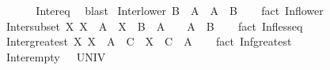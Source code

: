 \begin{isabellebody}
\ \ %
\isanewline
%
\isadelimproof
\ \ %
\endisadelimproof
%
\isatagproof
{}\isamarkupfalse%
\ Inter{\isacharunderscore}{\kern0pt}eq\ \isamarkupfalse%
\ blast%
\endisatagproof
{\isafoldproof}%
%
\isadelimproof
\isanewline
%
\endisadelimproof
\isanewline
{}\isamarkupfalse%
\ Inter{\isacharunderscore}{\kern0pt}lower{\isacharcolon}{\kern0pt}\ {\isachardoublequoteopen}B\ {\isasymin}\ A\ {\isasymLongrightarrow}\ {\isasymInter}A\ {\isasymsubseteq}\ B{\isachardoublequoteclose}\isanewline
%
\isadelimproof
\ \ %
\endisadelimproof
%
\isatagproof
{}\isamarkupfalse%
\ {\isacharparenleft}{\kern0pt}fact\ Inf{\isacharunderscore}{\kern0pt}lower{\isacharparenright}{\kern0pt}%
\endisatagproof
{\isafoldproof}%
%
\isadelimproof
\isanewline
%
\endisadelimproof
\isanewline
{}\isamarkupfalse%
\ Inter{\isacharunderscore}{\kern0pt}subset{\isacharcolon}{\kern0pt}\ {\isachardoublequoteopen}{\isacharparenleft}{\kern0pt}{\isasymAnd}X{\isachardot}{\kern0pt}\ X\ {\isasymin}\ A\ {\isasymLongrightarrow}\ X\ {\isasymsubseteq}\ B{\isacharparenright}{\kern0pt}\ {\isasymLongrightarrow}\ A\ {\isasymnoteq}\ {\isacharbraceleft}{\kern0pt}{\isacharbraceright}{\kern0pt}\ {\isasymLongrightarrow}\ {\isasymInter}A\ {\isasymsubseteq}\ B{\isachardoublequoteclose}\isanewline
%
\isadelimproof
\ \ %
\endisadelimproof
%
\isatagproof
{}\isamarkupfalse%
\ {\isacharparenleft}{\kern0pt}fact\ Inf{\isacharunderscore}{\kern0pt}less{\isacharunderscore}{\kern0pt}eq{\isacharparenright}{\kern0pt}%
\endisatagproof
{\isafoldproof}%
%
\isadelimproof
\isanewline
%
\endisadelimproof
\isanewline
{}\isamarkupfalse%
\ Inter{\isacharunderscore}{\kern0pt}greatest{\isacharcolon}{\kern0pt}\ {\isachardoublequoteopen}{\isacharparenleft}{\kern0pt}{\isasymAnd}X{\isachardot}{\kern0pt}\ X\ {\isasymin}\ A\ {\isasymLongrightarrow}\ C\ {\isasymsubseteq}\ X{\isacharparenright}{\kern0pt}\ {\isasymLongrightarrow}\ C\ {\isasymsubseteq}\ {\isasymInter}A{\isachardoublequoteclose}\isanewline
%
\isadelimproof
\ \ %
\endisadelimproof
%
\isatagproof
{}\isamarkupfalse%
\ {\isacharparenleft}{\kern0pt}fact\ Inf{\isacharunderscore}{\kern0pt}greatest{\isacharparenright}{\kern0pt}%
\endisatagproof
{\isafoldproof}%
%
\isadelimproof
\isanewline
%
\endisadelimproof
\isanewline
{}\isamarkupfalse%
\ Inter{\isacharunderscore}{\kern0pt}empty{\isacharcolon}{\kern0pt}\ {\isachardoublequoteopen}{\isasymInter}{\isacharbraceleft}{\kern0pt}{\isacharbraceright}{\kern0pt}\ {\isacharequal}{\kern0pt}\ UNIV{\isachardoublequoteclose}\isanewline

\end{isabellebody}
